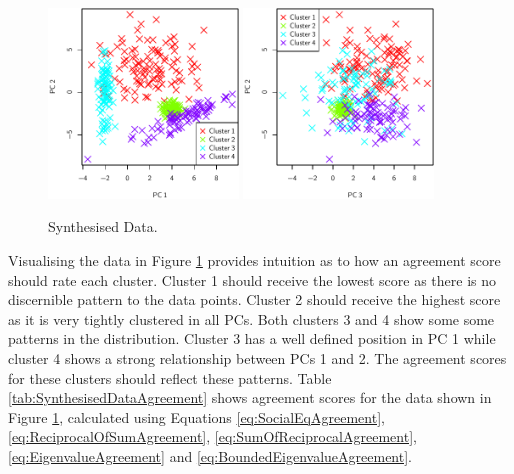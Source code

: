 			\begin{figure}[h!]
				\centering
				\subfloat
				{
					\includegraphics[width=0.45\textwidth]{chapter4/Images/ArtificialData1-2.pdf}
					\label{fig:EqualiserDifferencePCA}
				}
				\quad
				\subfloat
				{
					\includegraphics[width=0.45\textwidth]{chapter4/Images/ArtificialData3-2.pdf}
					\label{fig:EqualiserDifferenceCentroidsPCA}
				}
				\caption{Synthesised Data.}
				\label{fig:SynthesisedData}
			\end{figure}

			Visualising the data in Figure \ref{fig:SynthesisedData} provides intuition as to how an agreement
			score should rate each cluster. Cluster 1 should receive the lowest score as there is no
			discernible pattern to the data points. Cluster 2 should receive the highest score as it is very
			tightly clustered in all PCs. Both clusters 3 and 4 show some some patterns in the distribution.
			Cluster 3 has a well defined position in PC 1 while cluster 4 shows a strong relationship between
			PCs 1 and 2. The agreement scores for these clusters should reflect these patterns. Table
			\ref{tab:SynthesisedDataAgreement} shows agreement scores for the data shown in Figure
			\ref{fig:SynthesisedData}, calculated using Equations \ref{eq:SocialEqAgreement},
			\ref{eq:ReciprocalOfSumAgreement}, \ref{eq:SumOfReciprocalAgreement}, \ref{eq:EigenvalueAgreement}
			and \ref{eq:BoundedEigenvalueAgreement}.

